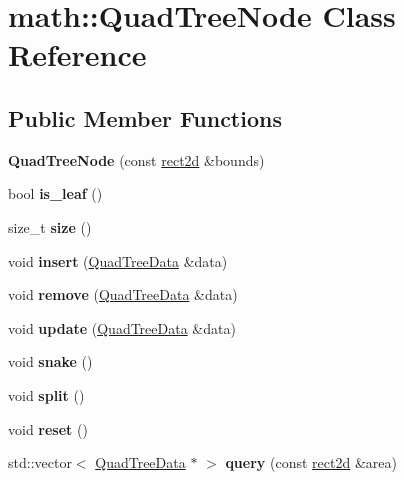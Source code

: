 \hypertarget{classmath_1_1QuadTreeNode}{}\section{math\+:\+:Quad\+Tree\+Node Class Reference}
\label{classmath_1_1QuadTreeNode}
\subsection*{Public Member Functions}
\begin{DoxyCompactItemize}
\item 
\mbox{\label{classmath_1_1QuadTreeNode_a45378c1fc9229e035a40ed9c06fe121d}} 
{\bfseries Quad\+Tree\+Node} (const \hyperlink{structmath_1_1rect2d}{rect2d} \&bounds)
\item 
\mbox{\label{classmath_1_1QuadTreeNode_a37e417c86117060dfe7874247baf0626}} 
bool {\bfseries is\+\_\+leaf} ()
\item 
\mbox{\label{classmath_1_1QuadTreeNode_add813eb0fcafbc6cf14368dddbb749b4}} 
size\+\_\+t {\bfseries size} ()
\item 
\mbox{\label{classmath_1_1QuadTreeNode_a14b91136aa6577fa0266b8028faa0e03}} 
void {\bfseries insert} (\hyperlink{structmath_1_1QuadTreeData}{Quad\+Tree\+Data} \&data)
\item 
\mbox{\label{classmath_1_1QuadTreeNode_a35cb167bcdbb4ce608752d3faa71903a}} 
void {\bfseries remove} (\hyperlink{structmath_1_1QuadTreeData}{Quad\+Tree\+Data} \&data)
\item 
\mbox{\label{classmath_1_1QuadTreeNode_a4075c9bf883c79abaed52dae6ecb2b36}} 
void {\bfseries update} (\hyperlink{structmath_1_1QuadTreeData}{Quad\+Tree\+Data} \&data)
\item 
\mbox{\label{classmath_1_1QuadTreeNode_a3e490921d9547c6f3481396ff1f917bb}} 
void {\bfseries snake} ()
\item 
\mbox{\label{classmath_1_1QuadTreeNode_a49f85405ae85f29030cdf2f29764097e}} 
void {\bfseries split} ()
\item 
\mbox{\label{classmath_1_1QuadTreeNode_a14dc470d9d9f45a3685228d40571d53e}} 
void {\bfseries reset} ()
\item 
\mbox{\label{classmath_1_1QuadTreeNode_a4f3dc18628e9487f04987afcacad12b7}} 
std\+::vector$<$ \hyperlink{structmath_1_1QuadTreeData}{Quad\+Tree\+Data} $\ast$ $>$ {\bfseries query} (const \hyperlink{structmath_1_1rect2d}{rect2d} \&area)
\end{DoxyCompactItemize}


